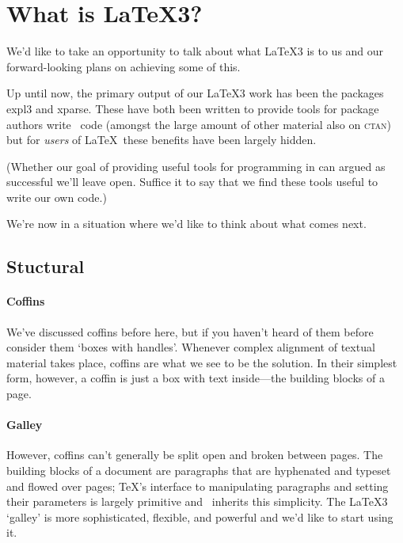 \documentclass{ltnews}
\providecommand\acro[1]{\textsc{\MakeLowercase{#1}}}
\begin{document}
  \renewcommand{\LaTeXNews}{\LaTeX3~News}
  \RaggedRight
  \setlength\parindent{1.5em}

\maketitle

\section{What is \LaTeX3?}

We'd like to take an opportunity to talk about what \LaTeX3 is to us and our forward-looking plans on achieving some of this.

Up until now, the primary output of our \LaTeX3 work has been the packages \textsf{expl3} and \textsf{xparse}.
These have both been written to provide tools for package authors write \LaTeXe\ code (amongst the large amount of other material also on \acro{CTAN}) but for \emph{users} of \LaTeX\ these benefits have been largely hidden.

(Whether our goal of providing useful tools for programming in can argued as successful we'll leave open.
Suffice it to say that we find these tools useful to write our own code.)

We're now in a situation where we'd like to think about what comes next.

\subsection{Stuctural}

\paragraph{Coffins}

We've discussed coffins before here, but if you haven't heard of them before consider them `boxes with handles'.
Whenever complex alignment of textual material takes place, coffins are what we see to be the solution.
In their simplest form, however, a coffin is just a box with text inside---the building blocks of a page.

\paragraph{Galley}

However, coffins can't generally be split open and broken between pages. The building blocks of a document are paragraphs that are hyphenated and typeset and flowed over pages; \TeX's interface to manipulating paragraphs and setting their parameters is largely primitive and \LaTeXe\ inherits this simplicity.
The \LaTeX3 `galley' is more sophisticated, flexible, and powerful and we'd like to start using it.
\end{document}
